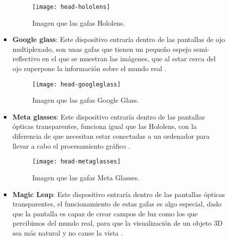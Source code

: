 \begin{itemize}
\begin{itemize}
\begin{itemize}
  \begin{figure}[h]
    \centering
    \texttt{[image: head-hololens]}
    \caption{Imagen que las gafas Hololens.\protect\footnotemark}
    \label{figura-hololens}
  \end{figure}


  \newpage

  \item \textbf{Google glass}: Este dispositivo entraría dentro de las pantallas de ojo multiplexado, son unas gafas que tienen un pequeño espejo semi-reflectivo en el que se muestran las imágenes, que al estar cerca del ojo superpone la información sobre el mundo real \cite{likamwa}.

  \begin{figure}[h]
    \centering
    \texttt{[image: head-googleglass]}
    \caption{Imagen que las gafas Google Glass.\protect\footnotemark}
    \label{figura-googleglass}
  \end{figure}


  \item \textbf{Meta glasses}: Este dispositivo entraría dentro de las pantallas ópticas transparentes, funciona igual que las Hololens, con la diferencia de que necesitan estar conectadas a un ordenador para llevar a cabo el procesamiento gráfico \cite{meta-vision}.

  \begin{figure}[h]
    \centering
    \texttt{[image: head-metaglasses]}
    \caption{Imagen que las gafas Meta Glasses.\protect\footnotemark}
    \label{figura-metaglasses}
  \end{figure}


  \newpage

  \item \textbf{Magic Leap}: Este dispositivo entraría dentro de las pantallas ópticas transparentes, el funcionamiento de estas gafas es algo especial, dado que la pantalla es capaz de crear campos de luz como los que percibimos del mundo real, para que la visualización de un objeto 3D sea más natural y no canse la vista \cite{magic-leap}.


\end{itemize}
\end{itemize}
\end{itemize}

